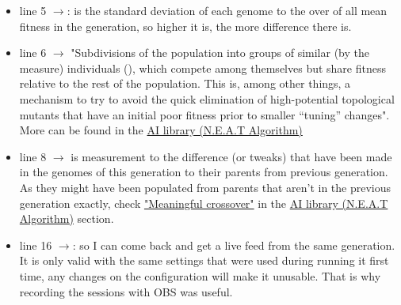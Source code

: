 \begin{itemize}
\item line 5 $\rightarrow$: is the standard deviation of each genome to the over of all mean fitness in the generation, so higher it is, the more difference there is.


\item line 6 $\rightarrow$ "Subdivisions of the population into groups of similar (by the  measure) individuals (), which compete among themselves but share fitness relative to the rest of the population. This is, among other things, a mechanism to try to avoid the quick elimination of high-potential topological mutants that have an initial poor fitness prior to smaller “tuning” changes". More can be found in the \hyperref[sec:ai-library-neat-algorithm]{AI library (N.E.A.T Algorithm)}


\item line 8 $\rightarrow$ is measurement to the difference (or tweaks) that have been made in the genomes of this generation to their parents from previous generation. As they might have been populated from parents that aren't in the previous generation exactly, check \hyperref[list:3tweanns]{"Meaningful crossover"} in the \hyperref[sec:ai-library-neat-algorithm]{AI library (N.E.A.T Algorithm)} section.

\item line 16 $\rightarrow$: so I can come back and get a live feed from the same generation. It is only valid with the same settings that were used during running it first time, any changes on the configuration will make it unusable. That is why recording the sessions with OBS was useful.
\end{itemize}
 
 
 
 
 
 
 
 
 
 
